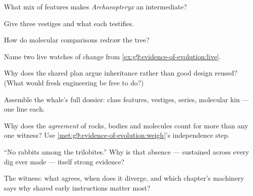 \begin{exercise}[$\star$]\label{exo:g9:evidence-of-evolution:3}
What mix of features makes \emph{Archaeopteryx} an
intermediate?
\end{exercise}

\begin{exercise}[$\star$]\label{exo:g9:evidence-of-evolution:4}
Give three vestiges and what each testifies.
\end{exercise}

\begin{exercise}[$\star$]\label{exo:g9:evidence-of-evolution:5}
How do molecular comparisons redraw the tree?
\end{exercise}

\begin{exercise}[$\star$]\label{exo:g9:evidence-of-evolution:6}
Name two live watches of change from
\cref{ex:g9:evidence-of-evolution:live}.
\end{exercise}

\begin{exercise}[$\star\star$]\label{exo:g9:evidence-of-evolution:7}
Why does the shared  plan argue inheritance rather
than good design reused? (What would fresh engineering
be free to do?)
\end{exercise}

\begin{exercise}[$\star\star$]\label{exo:g9:evidence-of-evolution:8}
Assemble the whale's full dossier: class features,
vestiges,  series, molecular kin --- one line
each.
\end{exercise}

\begin{exercise}[$\star\star$]\label{exo:g9:evidence-of-evolution:9}
Why does the \emph{agreement} of rocks, bodies and
molecules count for more than any one witness? Use
\cref{met:g9:evidence-of-evolution:weigh}'s
independence step.
\end{exercise}

\begin{exercise}[$\star\star$]\label{exo:g9:evidence-of-evolution:10}
``No rabbits among the trilobites.'' Why is that absence
--- sustained across every dig ever made --- itself
strong evidence?
\end{exercise}

\begin{exercise}[$\star\star$]\label{exo:g9:evidence-of-evolution:11}
The  witness: what agrees, when does it diverge,
and which chapter's machinery says why shared early
instructions matter most?
\end{exercise}

